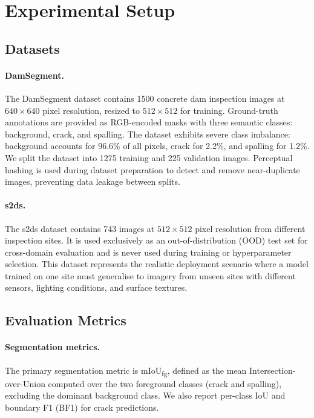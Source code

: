 \documentclass[preprint,12pt]{elsarticle}
\begin{document}

\section{Experimental Setup}
\label{sec:experimental_setup}

\subsection{Datasets}
\label{sec:datasets}

\paragraph{DamSegment.}
The DamSegment dataset contains 1500 concrete dam inspection images at $640 \times 640$ pixel resolution, resized to $512 \times 512$ for training. Ground-truth annotations are provided as RGB-encoded masks with three semantic classes: background, crack, and spalling. The dataset exhibits severe class imbalance: background accounts for 96.6\% of all pixels, crack for 2.2\%, and spalling for 1.2\%. We split the dataset into 1275 training and 225 validation images. Perceptual hashing is used during dataset preparation to detect and remove near-duplicate images, preventing data leakage between splits.

\paragraph{s2ds.}
The s2ds dataset contains 743 images at $512 \times 512$ pixel resolution from different inspection sites. It is used exclusively as an out-of-distribution (OOD) test set for cross-domain evaluation and is never used during training or hyperparameter selection. This dataset represents the realistic deployment scenario where a model trained on one site must generalise to imagery from unseen sites with different sensors, lighting conditions, and surface textures.

\subsection{Evaluation Metrics}
\label{sec:metrics}

\paragraph{Segmentation metrics.}
The primary segmentation metric is mIoU\textsubscript{fg}, defined as the mean Intersection-over-Union computed over the two foreground classes (crack and spalling), excluding the dominant background class. We also report per-class IoU and boundary F1 (BF1) for crack predictions.
\end{document}
